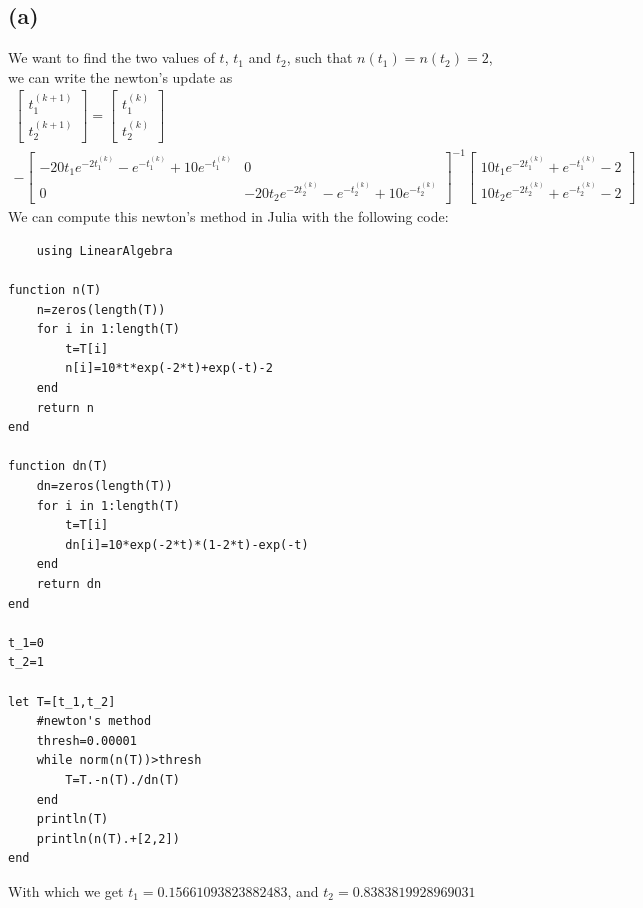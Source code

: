 \subsection*{(a)}
We want to find the two values of $t$, $t_1$ and $t_2$, such that
$n(t_1)=n(t_2)=2$, we can write the newton's update as 
\begin{multline*}
    \begin{bmatrix}
    t_1^{(k+1)}\\
    t_2^{(k+1)}
\end{bmatrix}=\begin{bmatrix}
    t_1^{(k)}\\
    t_2^{(k)}
\end{bmatrix}\\-\begin{bmatrix}
    -20t_1e^{-2t_1^{(k)}}-e^{-t_1^{(k)}}+10e^{-t_1^{(k)}} & 0\\
    0 & -20t_2e^{-2t_2^{(k)}}-e^{-t_2^{(k)}}+10e^{-t_2^{(k)}}
\end{bmatrix}^{-1}\begin{bmatrix}
    10t_1e^{-2t_1^{(k)}}+e^{-t_1^{(k)}}-2\\
    10t_2e^{-2t_2^{(k)}}+e^{-t_2^{(k)}}-2
\end{bmatrix}
\end{multline*}
We can compute this newton's method in Julia with the following code:
\begin{verbatim}
    using LinearAlgebra

function n(T)
    n=zeros(length(T))
    for i in 1:length(T)
        t=T[i]
        n[i]=10*t*exp(-2*t)+exp(-t)-2
    end
    return n
end

function dn(T)
    dn=zeros(length(T))
    for i in 1:length(T)
        t=T[i]
        dn[i]=10*exp(-2*t)*(1-2*t)-exp(-t)
    end
    return dn
end

t_1=0
t_2=1

let T=[t_1,t_2]
    #newton's method 
    thresh=0.00001
    while norm(n(T))>thresh
        T=T.-n(T)./dn(T)
    end
    println(T)
    println(n(T).+[2,2])
end
\end{verbatim}
With which we get
$t_1=0.15661093823882483$, and $t_2=0.8383819928969031$
